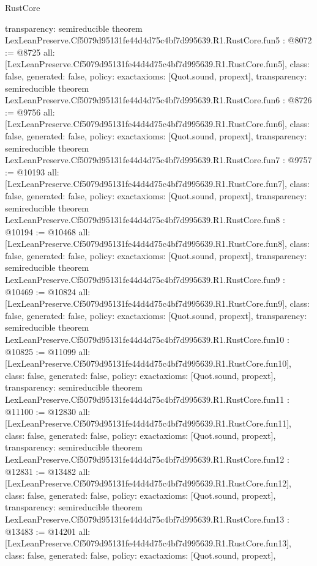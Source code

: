 \begin{lexlean}{RustCore}
\begin{coremodule}
{  transparency: semireducible
}
theorem LexLeanPreserve.Cf5079d95131fe44d4d75c4bf7d995639.R1.RustCore.fun5 : @8072 := @8725 {
  all: [LexLeanPreserve.Cf5079d95131fe44d4d75c4bf7d995639.R1.RustCore.fun5],
  class: false,
  generated: false,
  policy: exact{axioms: [Quot.sound, propext]},
  transparency: semireducible
}
theorem LexLeanPreserve.Cf5079d95131fe44d4d75c4bf7d995639.R1.RustCore.fun6 : @8726 := @9756 {
  all: [LexLeanPreserve.Cf5079d95131fe44d4d75c4bf7d995639.R1.RustCore.fun6],
  class: false,
  generated: false,
  policy: exact{axioms: [Quot.sound, propext]},
  transparency: semireducible
}
theorem LexLeanPreserve.Cf5079d95131fe44d4d75c4bf7d995639.R1.RustCore.fun7 : @9757 := @10193 {
  all: [LexLeanPreserve.Cf5079d95131fe44d4d75c4bf7d995639.R1.RustCore.fun7],
  class: false,
  generated: false,
  policy: exact{axioms: [Quot.sound, propext]},
  transparency: semireducible
}
theorem LexLeanPreserve.Cf5079d95131fe44d4d75c4bf7d995639.R1.RustCore.fun8 : @10194 := @10468 {
  all: [LexLeanPreserve.Cf5079d95131fe44d4d75c4bf7d995639.R1.RustCore.fun8],
  class: false,
  generated: false,
  policy: exact{axioms: [Quot.sound, propext]},
  transparency: semireducible
}
theorem LexLeanPreserve.Cf5079d95131fe44d4d75c4bf7d995639.R1.RustCore.fun9 : @10469 := @10824 {
  all: [LexLeanPreserve.Cf5079d95131fe44d4d75c4bf7d995639.R1.RustCore.fun9],
  class: false,
  generated: false,
  policy: exact{axioms: [Quot.sound, propext]},
  transparency: semireducible
}
theorem LexLeanPreserve.Cf5079d95131fe44d4d75c4bf7d995639.R1.RustCore.fun10 : @10825 := @11099 {
  all: [LexLeanPreserve.Cf5079d95131fe44d4d75c4bf7d995639.R1.RustCore.fun10],
  class: false,
  generated: false,
  policy: exact{axioms: [Quot.sound, propext]},
  transparency: semireducible
}
theorem LexLeanPreserve.Cf5079d95131fe44d4d75c4bf7d995639.R1.RustCore.fun11 : @11100 := @12830 {
  all: [LexLeanPreserve.Cf5079d95131fe44d4d75c4bf7d995639.R1.RustCore.fun11],
  class: false,
  generated: false,
  policy: exact{axioms: [Quot.sound, propext]},
  transparency: semireducible
}
theorem LexLeanPreserve.Cf5079d95131fe44d4d75c4bf7d995639.R1.RustCore.fun12 : @12831 := @13482 {
  all: [LexLeanPreserve.Cf5079d95131fe44d4d75c4bf7d995639.R1.RustCore.fun12],
  class: false,
  generated: false,
  policy: exact{axioms: [Quot.sound, propext]},
  transparency: semireducible
}
theorem LexLeanPreserve.Cf5079d95131fe44d4d75c4bf7d995639.R1.RustCore.fun13 : @13483 := @14201 {
  all: [LexLeanPreserve.Cf5079d95131fe44d4d75c4bf7d995639.R1.RustCore.fun13],
  class: false,
  generated: false,
  policy: exact{axioms: [Quot.sound, propext]},
}
\end{coremodule}
\end{lexlean}
